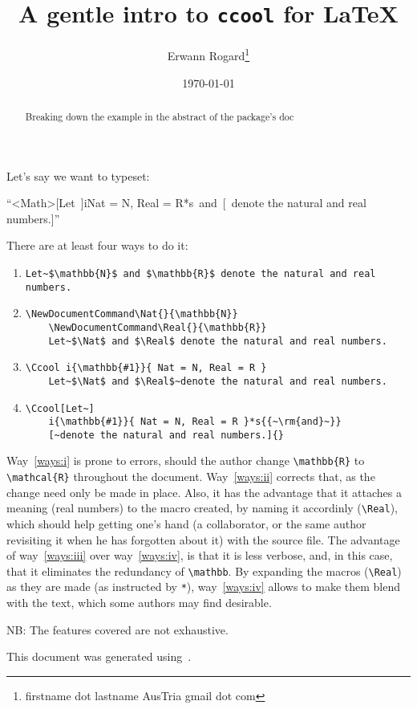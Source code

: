 \documentclass{article}
\title{A gentle intro to \texttt{ccool} for \LaTeX}
\author{Erwann Rogard\thanks{firstname dot lastname AusTria gmail dot com}}
\date{\today}
\providecommand\docways[1]{way~\ref{ways:#1}}
\providecommand\docWays[1]{Way~\ref{ways:#1}}
\begin{document}
\maketitle

\begin{abstract}
  Breaking down the example in the abstract of the package's doc\cite{ccool}
\end{abstract}


Let's say we want to typeset:
\begin{center}
  ``\Ccool<Math>[Let~]i{}{Nat = N, Real = R}*s{{~\rm{and}~}}[~denote the natural and real numbers.]{}''
\end{center}

There are at least four ways to do it:
\begin{enumerate}[label=\emph{\roman*)}]
\item \label{ways:i}
  \begin{Verbatim}[breaklines=true]
    Let~$\mathbb{N}$ and $\mathbb{R}$ denote the natural and real numbers.
  \end{Verbatim}
\item   \label{ways:ii}
  \begin{Verbatim}[breaklines=true]
    \NewDocumentCommand\Nat{}{\mathbb{N}}
    \NewDocumentCommand\Real{}{\mathbb{R}}
    Let~$\Nat$ and $\Real$ denote the natural and real numbers.
  \end{Verbatim}

\item  \label{ways:iii}
  \begin{Verbatim}[breaklines=true]
    \Ccool i{\mathbb{#1}}{ Nat = N, Real = R }
    Let~$\Nat$ and $\Real$~denote the natural and real numbers.
  \end{Verbatim}

\item  \label{ways:iv}
  \begin{Verbatim}[breaklines=true]
    \Ccool[Let~]
    i{\mathbb{#1}}{ Nat = N, Real = R }*s{{~\rm{and}~}}
    [~denote the natural and real numbers.]{}
  \end{Verbatim}
\end{enumerate}

\docWays{i} is prone to errors, should the author change \verb+\mathbb{R}+ to \verb+\mathcal{R}+ throughout the document.
\docWays{ii} corrects that, as the change need only be made in place.
Also, it has the advantage that it attaches a meaning (real numbers) to the macro created,
by naming it accordinly (\verb|\Real|), which should help getting one's hand (a collaborator,
or the same author revisiting it when he has forgotten about it) with the source file.
The advantage of \docways{iii} over  \docways{iv}, is that it is less verbose,
and, in this case, that it eliminates the redundancy of \verb|\mathbb|.
By expanding the macros (\verb+\Real+) as they are made (as instructed by \verb+*+), \docways{iv} allows to
make them blend with the text, which some authors may find desirable.

NB: The features covered are not exhaustive.

This document was generated using~\CcoolVers.

{}
\printbibliography[heading=subbibliography]
\end{document}
